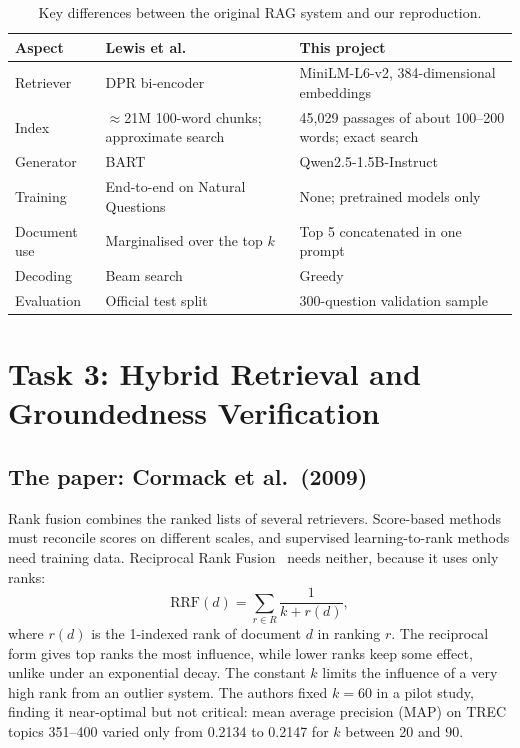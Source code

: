 \documentclass[11pt,a4paper]{article}
\begin{document}
\begin{table}[ht]
\centering
\small
\begin{tabularx}{\textwidth}{@{}lXX@{}}
\toprule
Aspect & Lewis et al.~\cite{rag} & This project \\
\midrule
Retriever & DPR bi-encoder & MiniLM-L6-v2, 384-dimensional embeddings \\
Index & $\approx$21M 100-word chunks; approximate search & 45,029 passages of about 100--200 words; exact search \\
Generator & BART & Qwen2.5-1.5B-Instruct \\
Training & End-to-end on Natural Questions & None; pretrained models only \\
Document use & Marginalised over the top $k$ & Top 5 concatenated in one prompt \\
Decoding & Beam search & Greedy \\
Evaluation & Official test split & 300-question validation sample \\
\bottomrule
\end{tabularx}
\caption{Key differences between the original RAG system and our reproduction.}
\label{tab:rag-diff}
\end{table}

\section{Task 3: Hybrid Retrieval and Groundedness Verification}

\subsection{The paper: Cormack et al.\ (2009)}
Rank fusion combines the ranked lists of several retrievers. Score-based methods must reconcile scores on different scales, and supervised learning-to-rank methods need training data. Reciprocal Rank Fusion~\cite{rrf} needs neither, because it uses only ranks:
\begin{equation}
    \text{RRF}(d) = \sum_{r \in R} \frac{1}{k + r(d)},
\end{equation}
where $r(d)$ is the 1-indexed rank of document $d$ in ranking $r$. The reciprocal form gives top ranks the most influence, while lower ranks keep some effect, unlike under an exponential decay. The constant $k$ limits the influence of a very high rank from an outlier system. The authors fixed $k=60$ in a pilot study, finding it near-optimal but not critical: mean average precision (MAP) on TREC topics 351--400 varied only from 0.2134 to 0.2147 for $k$ between 20 and 90.
\end{document}
